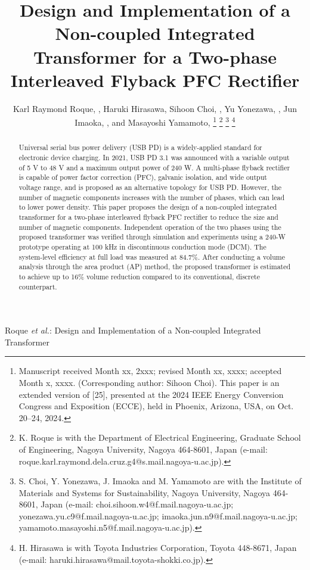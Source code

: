 \documentclass[lettersize,journal]{IEEEtran}
\begin{document}
\title{Design and Implementation of a Non-coupled Integrated Transformer for a Two-phase Interleaved Flyback PFC Rectifier}

\author{Karl Raymond Roque, , Haruki Hirasawa, Sihoon Choi, , Yu Yonezawa, , Jun Imaoka, , and Masayoshi Yamamoto, 
\thanks{Manuscript received Month xx, 2xxx; revised Month xx, xxxx; accepted Month x, xxxx. (Corresponding author: Sihoon Choi). This paper is an extended version of [25], presented at the 2024 IEEE Energy Conversion Congress and Exposition (ECCE), held in Phoenix, Arizona, USA, on Oct. 20–24, 2024.}
\thanks{K. Roque is with the Department of Electrical Engineering, Graduate School of Engineering, Nagoya University, Nagoya 464-8601, Japan (e-mail: roque.karl.raymond.dela.cruz.g4@s.mail.nagoya-u.ac.jp).}
\thanks{S. Choi, Y. Yonezawa, J. Imaoka and M. Yamamoto are with the Institute of Materials and Systems for Sustainability, Nagoya University, Nagoya 464-8601, Japan (e-mail: choi.sihoon.w4@f.mail.nagoya-u.ac.jp; yonezawa.yu.c9@f.mail.nagoya-u.ac.jp; imaoka.jun.n9@f.mail.nagoya-u.ac.jp; yamamoto.masayoshi.n5@f.mail.nagoya-u.ac.jp).}
\thanks{H. Hirasawa is with Toyota Industries Corporation, Toyota 448-8671, Japan (e-mail: haruki.hirasawa@mail.toyota-shokki.co.jp).}}

%
{Roque \MakeLowercase{\textit{et al.}}: Design and Implementation of a Non-coupled Integrated Transformer}

\maketitle

\begin{abstract}
Universal serial bus power delivery (USB PD) is a widely-applied standard for electronic device charging. In 2021, USB PD 3.1 was announced with a variable output of 5 V to 48 V and a maximum output power of 240 W. A multi-phase flyback rectifier is capable of power factor correction (PFC), galvanic isolation, and wide output voltage range, and is proposed as an alternative topology for USB PD. However, the number of magnetic components increases with the number of phases, which can lead to lower power density. This paper proposes the design of a non-coupled integrated transformer for a two-phase interleaved flyback PFC rectifier to reduce the size and number of magnetic components. Independent operation of the two phases using the proposed transformer was verified through simulation and experiments using a 240-W prototype operating at 100 kHz in discontinuous conduction mode (DCM). The system-level efficiency at full load was measured at 84.7\%. After conducting a volume analysis through the area product (AP) method, the proposed transformer is estimated to achieve up to 16\% volume reduction compared to its conventional, discrete counterpart.
\end{abstract}
\end{document}
